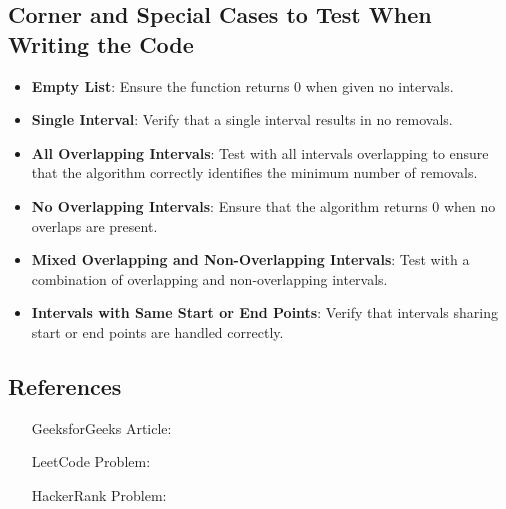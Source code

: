 \subsection*{Corner and Special Cases to Test When Writing the Code}
\begin{itemize}
    \item \textbf{Empty List}: Ensure the function returns 0 when given no intervals.
    
    \item \textbf{Single Interval}: Verify that a single interval results in no removals.
    
    \item \textbf{All Overlapping Intervals}: Test with all intervals overlapping to ensure that the algorithm correctly identifies the minimum number of removals.
    
    \item \textbf{No Overlapping Intervals}: Ensure that the algorithm returns 0 when no overlaps are present.
    
    \item \textbf{Mixed Overlapping and Non-Overlapping Intervals}: Test with a combination of overlapping and non-overlapping intervals.
    
    \item \textbf{Intervals with Same Start or End Points}: Verify that intervals sharing start or end points are handled correctly.
\end{itemize}

\subsection*{References}
\begin{itemize}
    \item [GeeksforGeeks Article:] 
    \item [LeetCode Problem:] 
    \item [HackerRank Problem:] 
\end{itemize}

